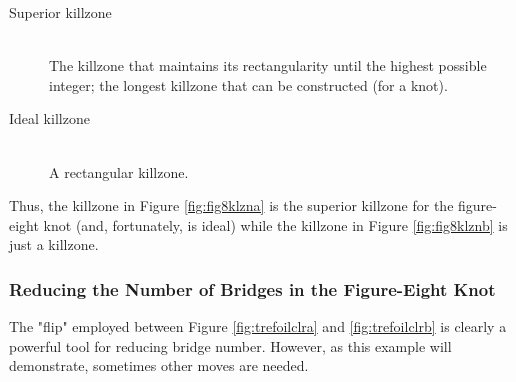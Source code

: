 \documentclass[titlepage,11pt]{article}
\begin{document}
\begin{defi}
    \begin{description}
        \item[Superior killzone] \hfill \\ The killzone that maintains its rectangularity until the highest possible integer; the longest killzone that can be constructed (for a knot).
        \item[Ideal killzone] \hfill \\ A rectangular killzone.
    \end{description}
\end{defi}

Thus, the killzone in Figure \ref{fig:fig8klzna} is the superior killzone for the figure-eight knot (and, fortunately, is ideal) while the killzone in Figure \ref{fig:fig8klznb} is just a killzone.


\subsubsection{Reducing the Number of Bridges in the Figure-Eight Knot}\label{ss2:fig8reduce}
The "flip" employed between Figure \ref{fig:trefoilclra} and \ref{fig:trefoilclrb} is clearly a powerful tool for reducing bridge number. However, as this example will demonstrate, sometimes other moves are needed.\par
\end{document}

